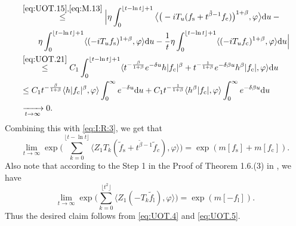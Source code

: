 \documentclass{amse-new}
\numberwithin{equation}{section}
\begin{document}
\begin{prof}
\begin{align}
	\\&
\begin{multlined}
	\overset{\eqref{eq:UOT.15},\eqref{eq:M.13}}\leq\Big| \eta \int_0^{\lfloor t-\ln t \rfloor+1}\big\langle \big(-iT_u(f_\mathrm s+t^{\tilde{\beta}-1}f_\mathrm c)\big)^{1+\beta},\varphi \big\rangle \mathrm du - {}
	\\ \eta \int_0^{\lfloor t-\ln t \rfloor+1} \langle (-iT_u f_\mathrm s)^{1+\beta}, \varphi \rangle  \mathrm du
	- \frac{1}{t} \eta
	\int_0^{\lfloor t-\ln t \rfloor+1} \langle (-iT_u f_\mathrm c)^{1+\beta}, \varphi \rangle  \mathrm du\Big|
\end{multlined}
	\\ & \overset{\eqref{eq:UOT.21}}\leq C_1\int_0^{\lfloor t-\ln t \rfloor+1}\langle t^{-\frac{\beta}{1+\beta}}e^{-\delta u}h|f_\mathrm c|^{\beta}+t^{-\frac{1}{1+\beta}}e^{-\delta\beta u}h^{\beta}|f_\mathrm c|, \varphi \rangle \mathrm du
	\\& \leq C_1 t^{-\frac{\beta}{1+\beta}} \langle h|f_\mathrm c|^{\beta},\varphi \rangle \int_0^\infty e^{-\delta u} \mathrm du + C_1 t^{-\frac{1}{1+\beta}} \langle h^\beta|f_\mathrm c|,\varphi \rangle \int_0^\infty e^{-\delta \beta u} \mathrm du
	\\& \xrightarrow[t\rightarrow \infty]{} 0.
\end{align}
	Combining this with \eqref{eq:I:R:3}, we get that
\begin{equation}
\label{eq:UOT.4}
	\lim_{t\rightarrow \infty}\exp\Big(\sum_{k=0}^{\lfloor t-\ln t \rfloor} \langle Z_1T_{k}(\tilde f_\mathrm s+t^{\tilde{\beta}-1}\tilde{f}_c), \varphi\rangle \Big)  = \exp( m[f_\mathrm s]+m[f_\mathrm c]).
\end{equation}
	Also note that according to the Step 1 in the Proof of Theorem 1.6.(3) in \cite{RenSongSunZhao2019Stable}, we have
\begin{equation}
\label{eq:UOT.5}
	\lim_{t\rightarrow \infty}\exp\Big(\sum_{k=0}^{\lfloor t^2 \rfloor}\langle Z_1(-T_k\tilde{f}_\mathrm l),\varphi\rangle\Big) =\exp(m[-f_\mathrm l]).
\end{equation}
	Thus the desired claim follows from \eqref{eq:UOT.4} and \eqref{eq:UOT.5}.
\end{prof}
\end{document}
